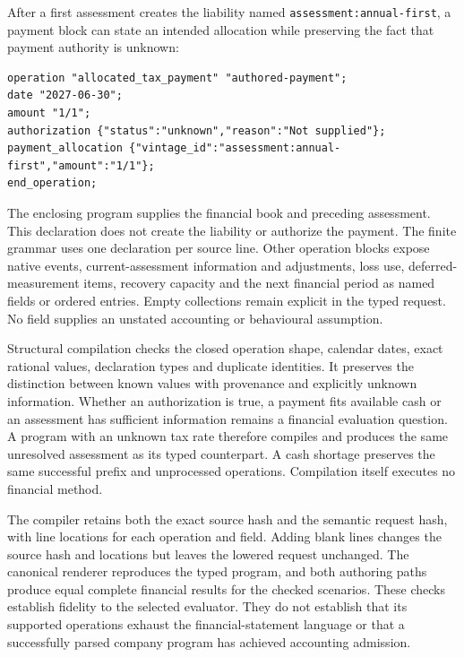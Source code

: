 After a first assessment creates the liability named
\texttt{assessment:annual-first}, a payment block can state an intended
allocation while preserving the fact that payment authority is unknown:
\begin{verbatim}
operation "allocated_tax_payment" "authored-payment";
date "2027-06-30";
amount "1/1";
authorization {"status":"unknown","reason":"Not supplied"};
payment_allocation {"vintage_id":"assessment:annual-first","amount":"1/1"};
end_operation;
\end{verbatim}
The enclosing program supplies the financial book and preceding assessment.
This declaration does not create the liability or authorize the payment. The
finite grammar uses one declaration per source line. Other
operation blocks expose native events, current-assessment information
and adjustments, loss use, deferred-measurement items, recovery capacity and
the next financial period as named fields or ordered entries. Empty
collections remain explicit in the typed request. No field supplies an
unstated accounting or behavioural assumption.

Structural compilation checks the closed operation shape, calendar dates,
exact rational values, declaration types and duplicate identities. It preserves
the distinction between known values with provenance and explicitly unknown
information. Whether an authorization is true, a payment fits available cash
or an assessment has sufficient information remains a financial evaluation
question. A program with an unknown tax rate therefore compiles and produces
the same unresolved assessment as its typed counterpart. A cash shortage
preserves the same successful prefix and unprocessed operations. Compilation
itself executes no financial method.

The compiler retains both the exact source hash and the semantic request hash,
with line locations for each operation and field. Adding blank lines changes
the source hash and locations but leaves the lowered request unchanged. The
canonical renderer reproduces the typed program, and both authoring paths
produce equal complete financial results for the checked scenarios. These
checks establish fidelity to the selected evaluator. They do not establish
that its supported operations exhaust the financial-statement language or
that a successfully parsed company program has achieved accounting admission.
